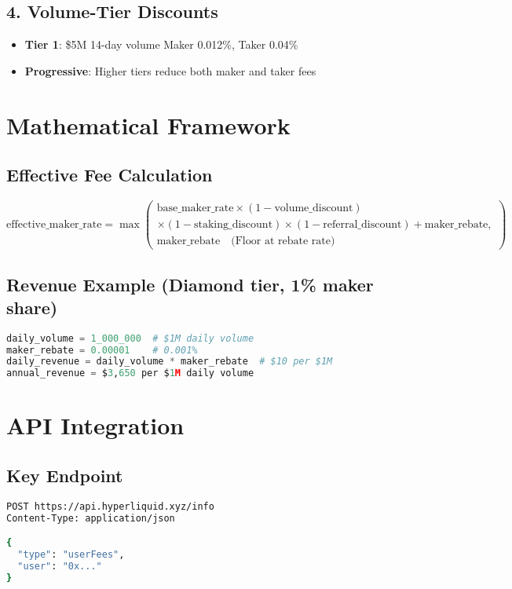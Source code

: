 \documentclass[11pt,a4paper]{article}
\begin{document}
\subsection{4. Volume-Tier Discounts}
\begin{itemize}
    \item \textbf{Tier 1}: \$5M 14-day volume \textrightarrow Maker 0.012\%, Taker 0.04\%
    \item \textbf{Progressive}: Higher tiers reduce both maker and taker fees
\end{itemize}

\section{Mathematical Framework}

\subsection{Effective Fee Calculation}
\begin{equation}
\text{effective\_maker\_rate} = \max\left(
\begin{array}{c}
\text{base\_maker\_rate} \times (1 - \text{volume\_discount}) \\
\times (1 - \text{staking\_discount}) \times (1 - \text{referral\_discount}) + \text{maker\_rebate},\\
\text{maker\_rebate} \quad \text{(Floor at rebate rate)}
\end{array}
\right)
\end{equation}

\subsection{Revenue Example (Diamond tier, 1\% maker share)}
\begin{lstlisting}[language=Python]
daily_volume = 1_000_000  # $1M daily volume
maker_rebate = 0.00001    # 0.001%
daily_revenue = daily_volume * maker_rebate  # $10 per $1M
annual_revenue = $3,650 per $1M daily volume
\end{lstlisting}

\section{API Integration}

\subsection{Key Endpoint}
\begin{lstlisting}[language=bash]
POST https://api.hyperliquid.xyz/info
Content-Type: application/json

{
  "type": "userFees",
  "user": "0x..."
}
\end{lstlisting}
\end{document}
